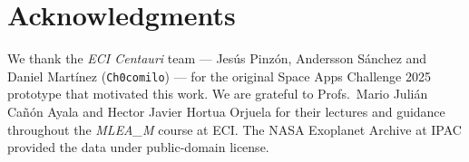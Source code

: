 \documentclass[conference]{IEEEtran}
\begin{document}
\section*{Acknowledgments}

We thank the \emph{ECI Centauri} team --- Jesús Pinzón, Andersson
Sánchez and Daniel Martínez (\texttt{Ch0comilo}) --- for the
original Space Apps Challenge 2025 prototype that motivated this work.
We are grateful to Profs.\ Mario Julián Cañón Ayala and Hector
Javier Hortua Orjuela for their lectures and guidance throughout the
\emph{MLEA\_M} course at ECI. The NASA Exoplanet Archive at IPAC
provided the data under public-domain license.


\end{document}
